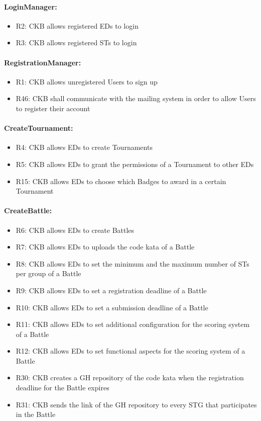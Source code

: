 \paragraph{LoginManager:}
\begin{itemize}
    \item R2: CKB allows registered EDs to login 
    \item R3: CKB allows registered STs to login
\end{itemize}


\paragraph{RegistrationManager:}
\begin{itemize}
    \item R1: CKB allows unregistered Users to sign up 
    \item R46: CKB shall communicate with the mailing system in order to allow Users to register their account 
\end{itemize}


\paragraph{CreateTournament:}
\begin{itemize}
    \item R4: CKB allows EDs to create Tournaments 
    \item R5: CKB allows EDs to grant the permissions of a Tournament to other EDs
    \item R15: CKB allows EDs to choose which Badges to award in a certain Tournament 
\end{itemize}


\paragraph{CreateBattle:}
\begin{itemize}
    \item R6: CKB allows EDs to create Battles 
    \item R7: CKB allows EDs to uploads the code kata of a Battle 
    \item R8: CKB allows EDs to set the minimum and the maximum number of STs per group of a Battle 
    \item R9: CKB allows EDs to set a registration deadline of a Battle 
    \item R10: CKB allows EDs to set a submission deadline of a Battle 
    \item R11: CKB allows EDs to set additional configuration for the scoring system of a Battle 
    \item R12: CKB allows EDs to set functional aspects for the scoring system of a Battle
    \item R30: CKB creates a GH repository of the code kata when the registration deadline for the Battle expires 
    \item R31: CKB sends the link of the GH repository to every STG that participates in the Battle 
\end{itemize}


